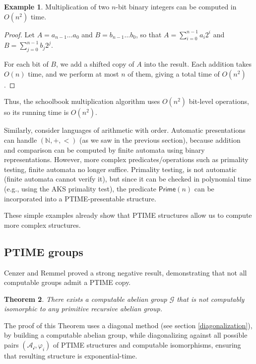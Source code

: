 \documentclass{pracalicmgr2025}
\theoremstyle{plain}            %
\newtheorem{theorem}{Theorem}[chapter]
\theoremstyle{remark}           %
\theoremstyle{definition}       %
\newtheorem{example}[theorem]{Example}
\begin{document}
\begin{example}
Multiplication of two $n$-bit binary integers can be computed in $O(n^2)$ time.
\end{example}

\begin{proof}
Let $A = a_{n-1}\dots a_0$ and $B = b_{n-1}\dots b_0$,  
so that $A = \sum_{i=0}^{n-1} a_i 2^i$ and $B = \sum_{j=0}^{n-1} b_j 2^j$.

For each bit of $B$, we add a shifted copy of $A$ into the result. Each addition takes $O(n)$ time, and we perform at most $n$ of them, giving a total time of $O(n^2)$.
\end{proof}

Thus, the schoolbook multiplication algorithm uses $O(n^2)$ bit-level operations, so its running time is $O(n^2)$.

\noindent
Similarly, consider languages of arithmetic with order. Automatic presentations can handle $(\mathbb{N}, +, <)$ (as we saw in the previous section), because addition and comparison can be computed by finite automata using binary representations. However, more complex predicates/operations such as primality testing, finite automata no longer suffice. Primality testing, is not automatic (finite automata cannot verify it), but since it can be checked in polynomial time (e.g., using the AKS primality test), the predicate $\mathsf{Prime}(n)$ can be incorporated into a PTIME-presentable structure.

These simple examples already show that PTIME structures allow us to compute more complex structures.

\subsection{PTIME groups}
Cenzer and Remmel proved a strong negative result, demonstrating that not all computable groups admit a PTIME copy.

\begin{theorem} \label{thm:ptgroup}
    There exists a computable abelian group $\mathcal{G}$ that is not computably isomorphic to any primitive recursive abelian group.
\end{theorem}

The proof of this Theorem uses a diagonal method (see section \ref{diagonalization}), by building a computable abelian group, while diagonalizing against all possible pairs $(\mathcal{A_i}, \varphi_i)$ of PTIME structures and computable isomorphisms, ensuring that resulting structure is exponential-time.
\end{document}
